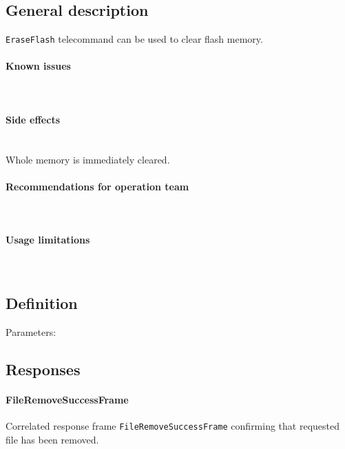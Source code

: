 

\subsection{General description}
\texttt{EraseFlash} telecommand can be used to clear \OBC flash memory. 

\paragraph{Known issues} \mbox{} \\
\None

\paragraph{Side effects} \mbox{} \\
Whole memory is immediately cleared.

\paragraph{Recommendations for operation team} \mbox{} \\
\None

\paragraph{Usage limitations} \mbox{} \\ 
\None

\subsection{Definition}

Parameters: 

\begin{tcarglist}
\end{tcarglist}

\subsection{Responses}
\paragraph{FileRemoveSuccessFrame}
Correlated response frame \texttt{FileRemoveSuccessFrame} confirming that requested file has been removed.

